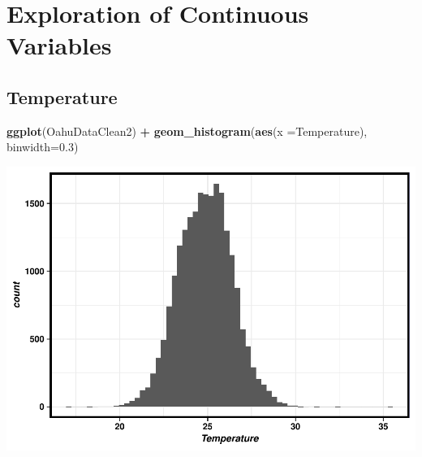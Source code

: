 \documentclass[12pt,]{article}
\newenvironment{Shaded}{\begin{snugshade}}{\end{snugshade}}
\newcommand{\KeywordTok}[1]{\textcolor[rgb]{0.13,0.29,0.53}{\textbf{#1}}}
\newcommand{\DataTypeTok}[1]{\textcolor[rgb]{0.13,0.29,0.53}{#1}}
\newcommand{\DecValTok}[1]{\textcolor[rgb]{0.00,0.00,0.81}{#1}}
\newcommand{\FloatTok}[1]{\textcolor[rgb]{0.00,0.00,0.81}{#1}}
\newcommand{\StringTok}[1]{\textcolor[rgb]{0.31,0.60,0.02}{#1}}
\newcommand{\OperatorTok}[1]{\textcolor[rgb]{0.81,0.36,0.00}{\textbf{#1}}}
\newcommand{\NormalTok}[1]{#1}
\begin{document}
\begin{Shaded}
\end{Shaded}

\section{Exploration of Continuous
Variables}\label{exploration-of-continuous-variables}

\subsection{Temperature}\label{temperature}

\begin{Shaded}
\begin{Highlighting}[]
\KeywordTok{ggplot}\NormalTok{(OahuDataClean2) }\OperatorTok{+}
\StringTok{  }\KeywordTok{geom_histogram}\NormalTok{(}\KeywordTok{aes}\NormalTok{(}\DataTypeTok{x =}\NormalTok{Temperature), }\DataTypeTok{binwidth=}\FloatTok{0.3}\NormalTok{)}
\end{Highlighting}
\end{Shaded}

\includegraphics{Garcia_ENV872_Project_files/figure-latex/unnamed-chunk-21-1.pdf}
\end{document}
